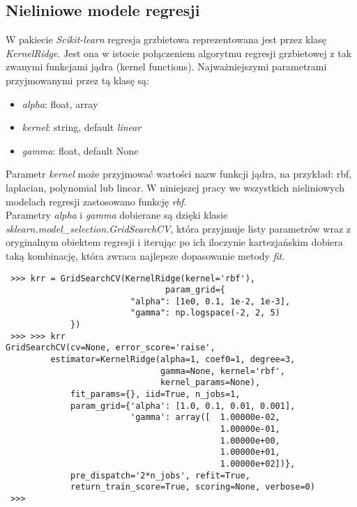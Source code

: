 \subsection{Nieliniowe modele regresji}
W pakiecie \textit{Scikit-learn} regresja grzbietowa reprezentowana jest przez klasę \textit{KernelRidge}.
Jest ona w istocie połączeniem algorytmu regresji grzbietowej z tak zwanymi funkcjami jądra (kernel functions).
Najważniejszymi parametrami przyjmowanymi przez tą klasę są:
\begin{itemize}
 \item \textit{alpha}: {float, array}
 \item \textit{kernel}: string, default \textit{linear}
 \item \textit{gamma}: float, default None\\
\end{itemize}

Parametr \textit{kernel} może przyjmować wartości nazw funkcji jądra, na przykład: rbf, laplacian, polynomial lub linear. W niniejszej pracy we wszystkich nieliniowych modelach regresji zastosowano funkcję \textit{rbf}.\\

Parametry \textit{alpha} i \textit{gamma} dobierane są dzięki klasie \textit{sklearn.model\_selection.GridSearchCV}, 
która przyjmuje listy parametrów wraz z oryginalnym obiektem regresji i iterując po ich iloczynie kartezjańskim dobiera taką kombinację, która zwraca najlepsze dopasowanie metody \textit{fit{}}.

\begin{lstlisting}
 >>> krr = GridSearchCV(KernelRidge(kernel='rbf'),
                                param_grid={
                         "alpha": [1e0, 0.1, 1e-2, 1e-3],
                         "gamma": np.logspace(-2, 2, 5)
			 })
 >>> >>> krr
GridSearchCV(cv=None, error_score='raise',
	     estimator=KernelRidge(alpha=1, coef0=1, degree=3,
	                           gamma=None, kernel='rbf',
	                           kernel_params=None),
             fit_params={}, iid=True, n_jobs=1,
             param_grid={'alpha': [1.0, 0.1, 0.01, 0.001], 
                         'gamma': array([  1.00000e-02,
                                           1.00000e-01,
                                           1.00000e+00,
                                           1.00000e+01,
                                           1.00000e+02])},
             pre_dispatch='2*n_jobs', refit=True,
             return_train_score=True, scoring=None, verbose=0)
 >>>             
\end{lstlisting}

